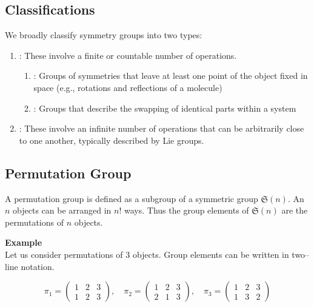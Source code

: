 \documentclass[a4paper,12pt]{article}
\theoremstyle{definition}
\begin{document}
\subsection{Classifications}
We broadly classify symmetry groups into two types:
\begin{enumerate}
    \item {}: These involve a finite or countable number of operations.
    \begin{enumerate}
        \item {}: Groups of symmetries that leave at least one point of the object fixed in space (e.g., rotations and reflections of a molecule)
        \item {}: Groups that describe the swapping of identical parts within a system
    \end{enumerate}
    \item {}: These involve an infinite number of operations that can be arbitrarily close to one another, typically described by Lie groups.
\end{enumerate}

\subsection{Permutation Group}
A permutation group is defined as a subgroup of a symmetric group $\mathfrak{S}(n)$. An $n$ objects can be arranged in $n!$ ways. Thus the group elements of $\mathfrak{S}(n)$ are the permutations of $n$ objects. 

\smallskip
\noindent\textbf{Example}\\
Let us consider permutations of $3$ objects. Group elements can be written in two--line notation.

\begin{equation*}
\pi_1 =
\begin{pmatrix}
1 & 2 & 3 \\
1 & 2 & 3
\end{pmatrix},
\quad
\pi_2 =
\begin{pmatrix}
1 & 2 & 3 \\
2 & 1 & 3
\end{pmatrix},
\quad
\pi_3 =
\begin{pmatrix}
1 & 2 & 3 \\
1 & 3 & 2
\end{pmatrix}
\end{equation*}
\end{document}
